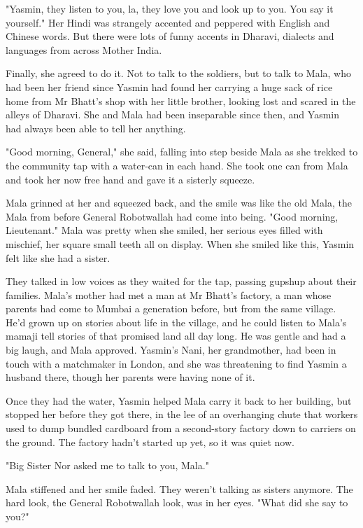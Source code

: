 "Yasmin, they listen to you, la, they love you and look up to you.
You say it yourself." Her Hindi was strangely accented and peppered
with English and Chinese words. But there were lots of funny
accents in Dharavi, dialects and languages from across Mother
India.

Finally, she agreed to do it. Not to talk to the soldiers, but to
talk to Mala, who had been her friend since Yasmin had found her
carrying a huge sack of rice home from Mr Bhatt's shop with her
little brother, looking lost and scared in the alleys of Dharavi.
She and Mala had been inseparable since then, and Yasmin had always
been able to tell her anything.

"Good morning, General," she said, falling into step beside Mala as
she trekked to the community tap with a water-can in each hand. She
took one can from Mala and took her now free hand and gave it a
sisterly squeeze.

Mala grinned at her and squeezed back, and the smile was like the
old Mala, the Mala from before General Robotwallah had come into
being. "Good morning, Lieutenant." Mala was pretty when she smiled,
her serious eyes filled with mischief, her square small teeth all
on display. When she smiled like this, Yasmin felt like she had a
sister.

They talked in low voices as they waited for the tap, passing
gupshup about their families. Mala's mother had met a man at Mr
Bhatt's factory, a man whose parents had come to Mumbai a
generation before, but from the same village. He'd grown up on
stories about life in the village, and he could listen to Mala's
mamaji tell stories of that promised land all day long. He was
gentle and had a big laugh, and Mala approved. Yasmin's Nani, her
grandmother, had been in touch with a matchmaker in London, and she
was threatening to find Yasmin a husband there, though her parents
were having none of it.

Once they had the water, Yasmin helped Mala carry it back to her
building, but stopped her before they got there, in the lee of an
overhanging chute that workers used to dump bundled cardboard from
a second-story factory down to carriers on the ground. The factory
hadn't started up yet, so it was quiet now.

"Big Sister Nor asked me to talk to you, Mala."

Mala stiffened and her smile faded. They weren't talking as sisters
anymore. The hard look, the General Robotwallah look, was in her
eyes. "What did she say to you?"

